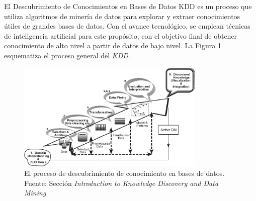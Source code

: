 El Descubrimiento de Conocimientos en Bases de Datos \gls{KDD} es un proceso que utiliza algoritmos de minería de datos para explorar y extraer conocimientos útiles de grandes bases de datos. Con el avance tecnológico, se emplean técnicas de inteligencia artificial para este propósito, con el objetivo final de obtener conocimiento de alto nivel a partir de datos de bajo nivel. La Figura \ref{fig:kdd} esquematiza el proceso general del \textit{KDD}.

\begin{figure}[H]
    \centering
    \includegraphics[angle=90,width=0.8\textwidth]{figures/chapter02/KDD.jpg}
    \caption{El proceso de descubrimiento de conocimiento en bases de datos.\\Fuente: Sección \textit{Introduction to Knowledge Discovery and Data Mining} \cite{rokach2010data}}
    \label{fig:kdd}
\end{figure}


